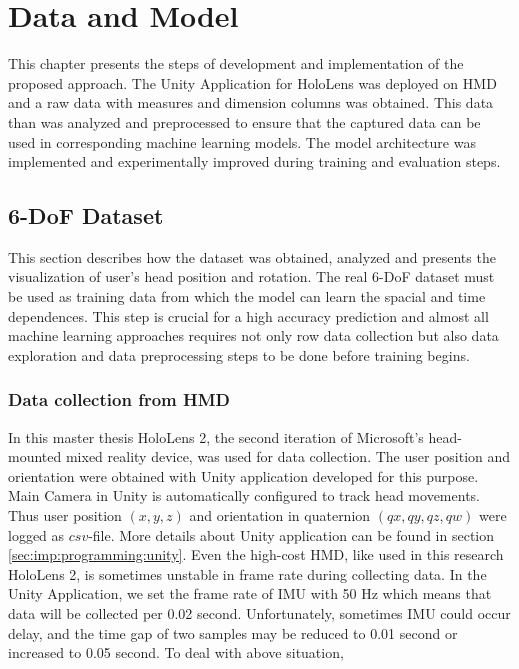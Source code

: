 \chapter{Data and Model}
\label{sec:design}
This chapter presents the steps of development and implementation of the proposed approach. The Unity Application for HoloLens was deployed on HMD and a raw data with measures and dimension columns was obtained. This data than was analyzed and preprocessed to ensure that the captured data can be used in corresponding machine learning models. The model architecture was implemented and experimentally improved during training and evaluation steps. 

\section{6-DoF Dataset}
\label{sec:design:dataset}
This section describes how the dataset was obtained, analyzed and presents the visualization of user's head position and rotation. The real 6-DoF dataset must be used as training data from which the model can learn the spacial and time dependences. This step is crucial for a high accuracy prediction and almost all machine learning approaches requires not only row data collection but also data exploration and data preprocessing steps to be done before training begins.

\subsection{Data collection from HMD}
\label{sec:design:dataset:HL}
In this master thesis HoloLens 2, the second iteration of Microsoft's head-mounted mixed reality device, was used for data collection. The user position and orientation were obtained with Unity application developed for this purpose. Main Camera in Unity is automatically configured to track head movements. Thus user position $(x, y, z)$ and orientation in quaternion $(qx, qy, qz, qw)$ were logged as $csv$-file. More details about Unity application can be found in section \ref{sec:imp:programming:unity}.
Even the high-cost HMD, like used in this research HoloLens 2, is sometimes unstable in frame rate during collecting data. In the Unity Application, we set the frame rate of IMU with 50 Hz which means that data will be collected per 0.02 second. Unfortunately, sometimes IMU could occur delay, and the time gap of two samples may be reduced to 0.01 second or increased to 0.05 second. To deal with above situation,

